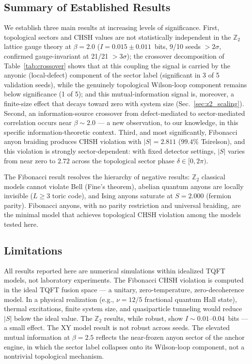 \documentclass[aps,pra,twocolumn,superscriptaddress,showpacs,floatfix]{revtex4-2}
\newcommand{\Ztwo}{\mathbb{Z}_2}
\begin{document}
\subsection{Summary of Established Results}

We establish three main results at increasing levels of significance. First,
topological sectors and CHSH values are not statistically independent in the
$\Ztwo$ lattice gauge theory at $\beta = 2.0$ ($I = 0.015 \pm 0.011$~bits, 9/10
seeds ${>}2\sigma$, confirmed gauge-invariant at 21/21 ${>}3\sigma$); the
crossover decomposition of Table~\ref{tab:crossover} shows that at this
coupling the signal is carried by the anyonic (local-defect) component of the
sector label (significant in 3 of 5 validation seeds), while the genuinely
topological Wilson-loop component remains below significance (1 of 5); and this
mutual-information signal is, moreover, a finite-size effect that decays toward
zero with system size (Sec.~\ref{sec:z2_scaling}). Second, an
information-source crossover from defect-mediated to sector-mediated correlation
occurs near $\beta \sim 2.0$ --- a new observation, to our knowledge, in this
specific information-theoretic context. Third, and most significantly,
Fibonacci anyon braiding produces CHSH violation with $|S| = 2.811$ ($99.4\%$
Tsirelson), and this violation is strongly sector-dependent: with fixed
detector settings, $|S|$ varies from near zero to $2.72$ across the topological
sector phase $\delta \in [0, 2\pi)$.

The Fibonacci result resolves the hierarchy of negative results: $\Ztwo$ classical
models cannot violate Bell (Fine's theorem), abelian quantum anyons are locally
invisible ($L \geq 3$ toric code), and Ising anyons saturate at $S = 2.000$
(fermion parity). Fibonacci anyons, with no parity restriction and universal
braiding, are the minimal model that achieves topological CHSH violation among
the models tested here.

\subsection{Limitations}

All results reported here are numerical simulations within idealized TQFT
models, not laboratory experiments.
The Fibonacci CHSH violation is computed in the ideal TQFT fusion space --- a
unitary, zero-temperature, zero-decoherence model. In a physical realization
(e.g., $\nu = 12/5$ fractional quantum Hall state), thermal excitations, finite
system size, and quasiparticle tunneling would reduce $|S|$ below the ideal value.
The $\Ztwo$ results, while robust, show $I \sim 0.01$--$0.04$~bits --- a small
effect. The XY model result is not robust across seeds. The elevated mutual
information at $\beta = 2.5$ reflects the near-frozen anyon sector of the anchor
engine, in which the sector label collapses onto its Wilson-loop component, not
a nontrivial topological mechanism.
\end{document}
